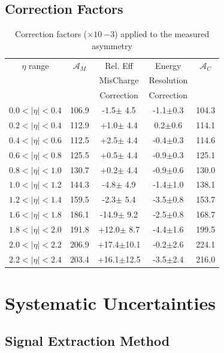 \subsection{Correction Factors}

\begin{table}[htbp]
  \begin{center}
    \begin{tabular}{ccccc}
$\eta$ range & $\mathcal{A}_M$ & Rel. Eff & Energy & $\mathcal{A}_C$ \\
& & MisCharge & Resolution &  \\
& & Correction  & Correction & \\
\hline
 $0.0<|\eta|<0.4$ & 106.9 &-1.5$\pm$ 4.5 & -1.1$\pm$0.3 & 104.3\\ 
 $0.2<|\eta|<0.4$ & 112.9 &+1.0$\pm$ 4.4 &  0.2$\pm$0.6 & 114.1\\ 
 $0.4<|\eta|<0.6$ & 112.5 &+2.5$\pm$ 4.4 & -0.4$\pm$0.3 & 114.6\\
 $0.6<|\eta|<0.8$ & 125.5 &+0.5$\pm$ 4.4 & -0.9$\pm$0.3 & 125.1\\ 
 $0.8<|\eta|<1.0$ & 130.7 &+0.2$\pm$ 4.4 & -0.9$\pm$0.6 & 130.0\\ 
 $1.0<|\eta|<1.2$ & 144.3 &-4.8$\pm$ 4.9 & -1.4$\pm$1.0 & 138.1\\ 
 $1.2<|\eta|<1.4$ & 159.5 &-2.3$\pm$ 5.4 & -3.5$\pm$0.8 & 153.7\\ 
 $1.6<|\eta|<1.8$ & 186.1 &-14.9$\pm$ 9.2 & -2.5$\pm$0.8 & 168.7\\
 $1.8<|\eta|<2.0$ & 191.8 &+12.0$\pm$ 8.7 & -4.4$\pm$1.6 & 199.5\\
 $2.0<|\eta|<2.2$ & 206.9 &+17.4$\pm$10.1&  -0.2$\pm$2.6 & 224.1\\
 $2.2<|\eta|<2.4$ & 203.4 &+16.1$\pm$12.5 & -3.5$\pm$2.4 & 216.0\\

    \end{tabular}
    \caption{\label{tab:CorrectionFactors}Correction factors ($\times 10~{-3}$) applied to the measured asymmetry}
  \end{center}
\end{table}


\section{Systematic Uncertainties}

\subsection{Signal Extraction Method}

